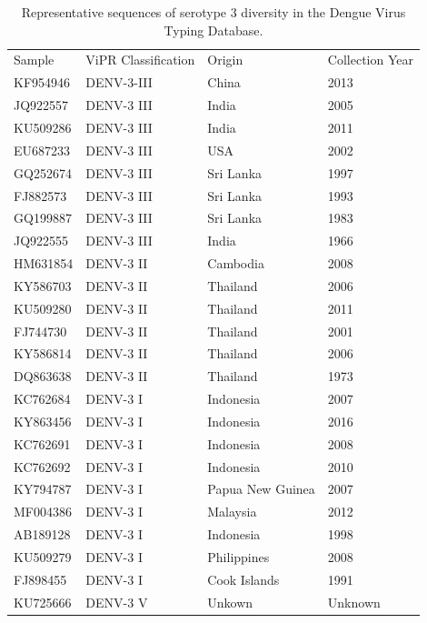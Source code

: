 \begin{longtable}{@{}llll@{}}
\caption{Representative sequences of serotype 3 diversity in the Dengue Virus Typing Database.}
\label{tab:chap4_s9}\\
Sample   & ViPR Classification & Origin           & Collection Year \\
KF954946 & DENV-3-III          & China            & 2013            \\
JQ922557 & DENV-3 III          & India            & 2005            \\
KU509286 & DENV-3 III          & India            & 2011            \\
EU687233 & DENV-3 III          & USA              & 2002            \\
GQ252674 & DENV-3 III          & Sri Lanka        & 1997            \\
FJ882573 & DENV-3 III          & Sri Lanka        & 1993            \\
GQ199887 & DENV-3 III          & Sri Lanka        & 1983            \\
JQ922555 & DENV-3 III          & India            & 1966            \\
HM631854 & DENV-3 II           & Cambodia         & 2008            \\
KY586703 & DENV-3 II           & Thailand         & 2006            \\
KU509280 & DENV-3 II           & Thailand         & 2011            \\
FJ744730 & DENV-3 II           & Thailand         & 2001            \\
KY586814 & DENV-3 II           & Thailand         & 2006            \\
DQ863638 & DENV-3 II           & Thailand         & 1973            \\
KC762684 & DENV-3 I            & Indonesia        & 2007            \\
KY863456 & DENV-3 I            & Indonesia        & 2016            \\
KC762691 & DENV-3 I            & Indonesia        & 2008            \\
KC762692 & DENV-3 I            & Indonesia        & 2010            \\
KY794787 & DENV-3 I            & Papua New Guinea & 2007            \\
MF004386 & DENV-3 I            & Malaysia         & 2012            \\
AB189128 & DENV-3 I            & Indonesia        & 1998            \\
KU509279 & DENV-3 I            & Philippines      & 2008            \\
FJ898455 & DENV-3 I            & Cook Islands     & 1991            \\
KU725666 & DENV-3 V            & Unkown           & Unknown        
\end{longtable}

